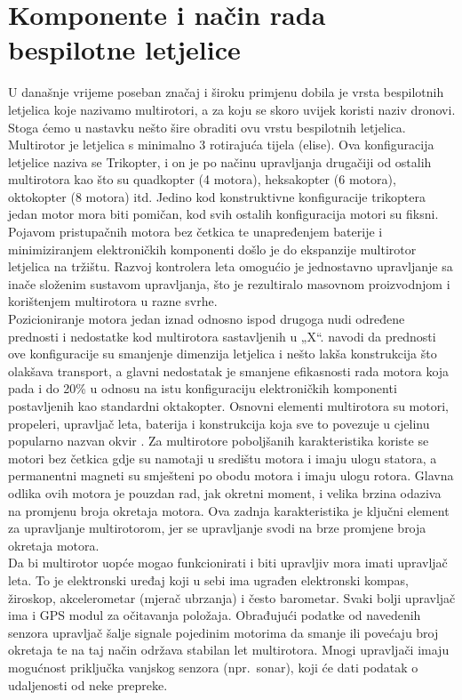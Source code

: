 \documentclass[times, utf8, diplomski]{fer}
\begin{document}
\section{Komponente i način rada bespilotne letjelice}
U današnje vrijeme poseban značaj i široku primjenu dobila je vrsta bespilotnih letjelica koje nazivamo multirotori,  a za koju  se skoro uvijek koristi naziv  dronovi.  Stoga ćemo  u nastavku nešto šire obraditi ovu vrstu bespilotnih letjelica.\\
Multirotor je letjelica s minimalno 3 rotirajuća tijela (elise). Ova konfiguracija letjelice naziva se Trikopter, i on je po načinu upravljanja drugačiji od ostalih multirotora kao što su quadkopter   (4   motora),   heksakopter   (6   motora),   oktokopter   (8   motora)   itd.   Jedino   kod konstruktivne konfiguracije  trikoptera  jedan  motor  mora  biti pomičan,  kod  svih  ostalih konfiguracija  motori  su  fiksni.  Pojavom pristupačnih motora bez četkica   te unapređenjem baterije  i minimiziranjem elektroničkih  komponenti  došlo  je  do  ekspanzije multirotor letjelica na tržištu. Razvoj kontrolera leta omogućio je jednostavno upravljanje sa inače složenim sustavom upravljanja, što je rezultiralo masovnom proizvodnjom i korištenjem multirotora u razne svrhe.\\
Pozicioniranje  motora  jedan  iznad  odnosno ispod drugoga nudi određene prednosti i nedostatke  kod  multirotora  sastavljenih  u  „X“.  \citet{Zilic}  navodi  da  prednosti  ove konfiguracije su smanjenje dimenzija letjelica i nešto lakša konstrukcija što olakšava transport, a glavni nedostatak je smanjene efikasnosti rada motora koja pada i do 20\% u odnosu na istu konfiguraciju  elektroničkih  komponenti  postavljenih  kao  standardni  oktakopter.  Osnovni elementi  multirotora  su  motori,  propeleri, upravljač leta,  baterija  i  konstrukcija  koja  sve  to povezuje   u   cjelinu   popularno   nazvan   okvir   .  Za  multirotore  poboljšanih karakteristika koriste se motori bez četkica gdje su namotaji u središtu motora i imaju ulogu statora, a permanentni magneti su smješteni po obodu motora i imaju ulogu rotora. Glavna odlika ovih motora je pouzdan rad, jak okretni moment, i velika brzina odaziva na promjenu broja okretaja motora. Ova zadnja karakteristika je ključni element za upravljanje multirotorom, jer se upravljanje svodi na brze promjene broja okretaja motora.\\
Da bi multirotor uopće mogao funkcionirati i biti upravljiv mora imati upravljač leta. To je elektronski uređaj koji u sebi ima ugrađen elektronski kompas, žiroskop, akcelerometar (mjerač ubrzanja) i često barometar. Svaki bolji upravljač ima i GPS  modul za očitavanja položaja. Obrađujući podatke od navedenih senzora upravljač šalje signale pojedinim motorima da smanje ili povećaju broj okretaja te na taj način održava stabilan let  multirotora.  Mnogi upravljači imaju mogućnost priključka vanjskog senzora  (npr.~sonar), koji će dati podatak o udaljenosti od neke prepreke. \citep{Zilic}\\
\end{document}
